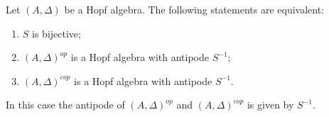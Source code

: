\begin{proposition}     \label{PropAAopAcopHopfSSemu}
    Let \( (A,\Delta)\) be a Hopf algebra. The following statements are equivalent:
    \begin{enumerate}
        \item   \label{ItemPropAAopAcopHopfSSemui}
            \( S\) is bijective;
        \item\label{ItemPropAAopAcopHopfSSemuii}
            \( (A,\Delta)^{op}\) is a Hopf algebra with antipode \( S^{-1}\);
        \item\label{ItemPropAAopAcopHopfSSemuiii}
            \( (A,\Delta)^{cop}\) is a Hopf algebra with antipode \( S^{-1}\).
    \end{enumerate}
    In this case the antipode of \( (A,\Delta)^{op}\) and \( (A,\Delta)^{cop}\) is given by \( S^{-1}\).
\end{proposition}

